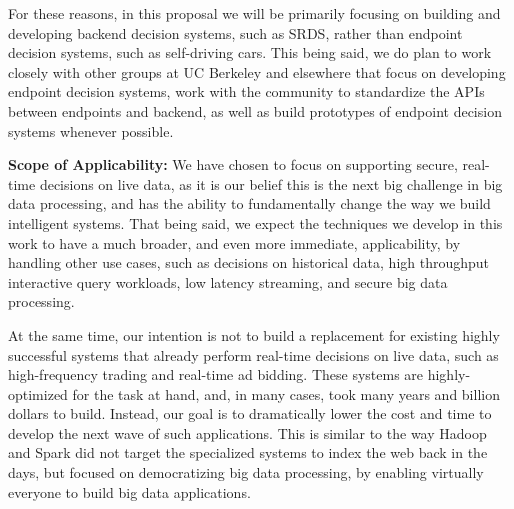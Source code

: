 For these reasons, in this proposal we will be primarily focusing on building and developing backend decision systems, such as SRDS, rather than endpoint decision systems, such as self-driving cars. This being said, we do plan to work closely with other groups at UC Berkeley and elsewhere that focus on developing endpoint decision systems, work with the community to standardize the APIs between endpoints and backend, as well as build prototypes of endpoint decision systems whenever possible.  


{\bf Scope of Applicability:} We have chosen to focus on supporting secure, real-time decisions on live data, as it is our belief this is the next big challenge in big data processing, and has the ability to fundamentally change the way we build intelligent systems. That being said, we expect the techniques we develop in this work to have a much broader, and even more immediate, applicability, by handling other use cases, such as decisions on historical data, high throughput interactive query workloads, low latency streaming, and secure big data processing.

At the same time, our intention is not to build a replacement for existing highly successful systems that already perform real-time decisions on live data, such as high-frequency trading and real-time ad bidding. These systems are highly-optimized for the task at hand, and, in many cases, took many years and billion dollars to build. Instead, our goal is to dramatically lower the cost and time to develop the next wave of such applications. This is similar to the way Hadoop and Spark did not target the specialized systems to index the web back in the days, but focused on democratizing big data processing, by enabling virtually everyone to build big data applications.
